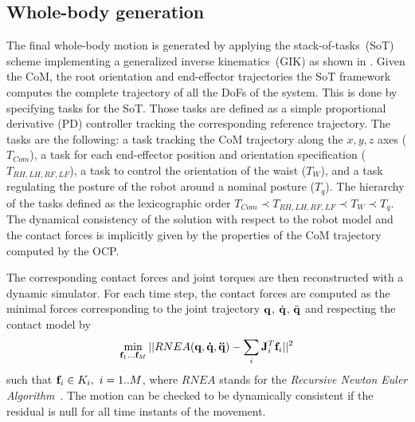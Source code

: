 \subsection{Whole-body generation}
The final whole-body motion is generated by applying the stack-of-tasks~(SoT) scheme implementing a generalized inverse kinematics~(GIK) as shown in \cite{mansard:icar:09}.
Given the CoM, the root orientation and end-effector trajectories the SoT framework computes the complete trajectory of all the DoFs of the system.
This is done by specifying tasks for the SoT.
Those tasks are defined as a simple proportional derivative (PD) controller tracking the corresponding reference trajectory.
The tasks are the following: a task tracking the CoM trajectory along the $x,y,z$ axes ($T_{Com}$), a task for each end-effector position and orientation specification ($T_{RH,LH,RF,LF}$), a task to control the orientation of the waist ($T_{W}$), and a task regulating the posture of the robot around a nominal posture ($T_{q}$).
The hierarchy of the tasks defined as the lexicographic order
$T_{Com} \prec T_{RH,LH,RF,LF} \prec T_{W}  \prec T_{q}$.
The dynamical consistency of the solution with respect to the robot model and the contact forces is implicitly given by the properties of the CoM trajectory computed by the OCP.

The corresponding contact forces and joint torques are then reconstructed with a dynamic simulator.
For each time step, the contact forces are computed as the minimal forces corresponding to the joint trajectory ${\bf q}$, $\dot{\bf q}$, $\ddot{\bf q}$ and respecting the contact model by
$$ \min_{{\bf f}_1 \dots {\bf f}_M} || RNEA({\bf q},{\bf \dot q},{\bf \ddot q}) - \sum_i {\bf J}_i^T {\bf f}_i ||^2 $$
such that ${\bf f}_i \in {K}_i, \ i = 1..M $, where $RNEA$ stands for the {\it Recursive Newton Euler Algorithm}~\cite{luh1980line}. %
The motion can be checked to be dynamically consistent if the residual is null for all time instants of the movement.
